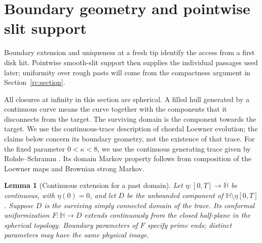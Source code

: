 \documentclass[11pt]{article}
\newtheorem{lemma}[theorem]{Lemma}
\theoremstyle{definition}
\theoremstyle{remark}
\numberwithin{equation}{section}
\begin{document}
\section{Boundary geometry and pointwise slit support}
\label{geom:section}

Boundary extension and uniqueness at a fresh tip identify the access
from a first disk hit. Pointwise smooth-slit support then supplies the
individual passages used later; uniformity over rough pasts will come
from the compactness argument in Section~\ref{rc:section}.

All closures at infinity in this section are spherical.  A filled hull
generated by a continuous curve means the curve together with the components
that it disconnects from the target.  The surviving domain is the component
towards the target.  We use the continuous-trace description of chordal
Loewner evolution; the claims below concern its boundary geometry, not the
existence of that trace. For the fixed parameter $0<\kappa<8$, we use
the continuous generating trace given by Rohde--Schramm
\cite[Theorem~5.1]{rohdeschramm2005}. Its domain Markov property follows
from composition of the Loewner maps and Brownian strong Markov.


\begin{lemma}[Continuous extension for a past domain]
\label{geom:extension}
Let $\eta:[0,T]\to\overline{\mathbb H}$ be continuous, with $\eta(0)=0$,
and let $D$ be the unbounded component of
$\mathbb H\setminus\eta[0,T]$.  Suppose $D$ is the surviving simply
connected domain of the trace.  Its conformal uniformization
$F:\mathbb H\to D$ extends continuously from the closed half-plane in
the spherical topology.  Boundary parameters of $F$ specify prime ends;
distinct parameters may have the same physical image.
\end{lemma}
\end{document}
